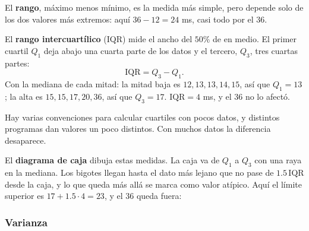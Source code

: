 \documentclass[11pt,letterpaper]{article}
\begin{document}
El \textbf{rango}, máximo menos mínimo, es la medida más simple, pero
depende solo de los dos valores más extremos: aquí $36 - 12 = 24$ ms,
casi todo por el $36$.

El \textbf{rango intercuartílico} (IQR) mide el ancho del $50\%$ de en
medio. El primer cuartil $Q_1$ deja abajo una cuarta parte de los
datos y el tercero, $Q_3$, tres cuartas partes:
\[
    \text{IQR} = Q_3 - Q_1 .
\]
Con la mediana de cada mitad: la mitad baja es $12, 13, 13, 14, 15$,
así que $Q_1 = 13$; la alta es $15, 15, 17, 20, 36$, así que
$Q_3 = 17$. $\text{IQR} = 4$ ms, y el $36$ no lo afectó.

\begin{observacion}
    Hay varias convenciones para calcular cuartiles con pocos datos, y
    distintos programas dan valores un poco distintos. Con muchos
    datos la diferencia desaparece.
\end{observacion}

El \textbf{diagrama de caja} dibuja estas medidas. La caja va de $Q_1$
a $Q_3$ con una raya en la mediana. Los bigotes llegan hasta el dato
más lejano que no pase de $1.5\,\text{IQR}$ desde la caja, y lo que
queda más allá se marca como valor atípico. Aquí el límite superior es
$17 + 1.5 \cdot 4 = 23$, y el $36$ queda fuera:

\begin{center}
\end{center}

\subsubsection*{Varianza}
\end{document}
